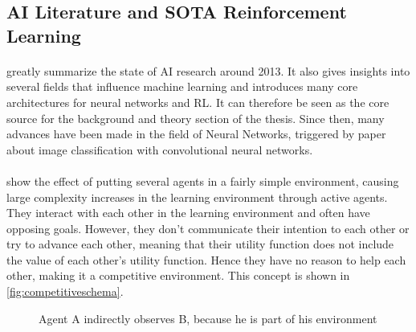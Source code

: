 \documentclass[12pt,a4paper]{article}
\begin{document}



\subsection{\ac{AI} Literature and \ac{SOTA} Reinforcement Learning}

\paragraph{\citeauthor{russell2016artificial}} greatly summarize the state of AI research around 2013. It also gives
insights into several fields that influence machine learning and introduces many core architectures for neural networks
and \ac{RL}. It can therefore be seen as the core source for the background and theory section of the thesis. Since
then, many advances have been made in the field of Neural Networks, triggered by \citeauthor{krizhevsky2012imagenet}
paper about image classification with convolutional neural networks.

\paragraph{\citeauthor{bansal2017emergent}} show the effect of putting several agents in a fairly simple environment,
causing large complexity increases in the learning environment through active agents. They interact with each other in
the learning environment and often have opposing goals. However, they don't communicate their intention to each other or
try to advance each other, meaning that their utility function does not include the value of each other's utility
function. Hence they have no reason to help each other, making it a competitive environment. This concept is shown in
\autoref{fig:competitiveschema}.

\begin{figure}[H] \centering {} \caption{Agent A indirectly observes B, because he is part of his environment}
\label{fig:competitiveschema} \end{figure}
\end{document}
